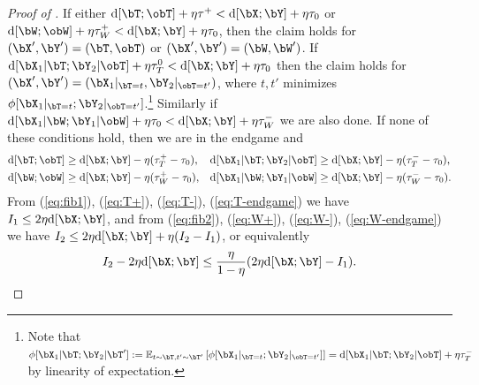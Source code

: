 \documentclass{article}
\DeclarePairedDelimiter{\sqpar}{[}{]}
\newcommand{\Ruz}{\mathrm{d}\sqpar}
\newcommand{\pot}{\phi\sqpar}
\begin{document}
\begin{proof}[Proof of ]
If either $\Ruz{\bT;\obT} + \eta\tau^+< \Ruz{\bX;\bY}+\eta \tau_0$ or $\Ruz{\bW;\obW}+\eta\tau^+_W< \Ruz{\bX;\bY}+\eta\tau_0$, then the claim holds for $(\bX',\bY')=(\bT,\obT)$ or $(\bX',\bY')=(\bW,\bW')$. If $\Ruz{\bX_1|\bT;\bY_2|\obT}+ \eta \tau^0_T< \Ruz{\bX;\bY}+\eta\tau_0$ then the claim holds for $(\bX',\bY')=(\bX_1|_{\bT=t},\bY_2|_{\obT=t'})$, where $t,t'$ minimizes $\pot{\bX_1|_{\bT=t};\bY_2|_{\obT=t'}}$.\footnote{Note that $\pot{\bX_1|\bT;\bY_2|\bT'}:=\ex[t\sim\bT,t'\sim\bT']{\pot{\bX_1|_{\bT=t};\bY_2|_{\obT=t'}}}=\Ruz{\bX_1|\bT;\bY_2|\obT}+\eta\tau^-_T$ by linearity of expectation.} Similarly if $\Ruz{\bX_1|\bW;\bY_1|\obW}+\eta\tau_0< \Ruz{\bX;\bY}+\eta\tau_W^-$ we are also done. If none of these conditions hold, then we are in the endgame and 
\begin{align}
\Ruz{\bT;\obT}&\ge\Ruz{\bX;\bY}-\eta(\tau^+_T-\tau_0),& \Ruz{\bX_1|\bT;\bY_2|\obT}&\ge \Ruz{\bX;\bY}-\eta(\tau^-_T-\tau_0),\label{eq:T-endgame}\\
\Ruz{\bW;\obW}&\ge\Ruz{\bX;\bY}-\eta(\tau^+_W-\tau_0),& \Ruz{\bX_1|\bW;\bY_1|\obW}&\ge \Ruz{\bX;\bY}-\eta(\tau^-_W-\tau_0).\label{eq:W-endgame}
\end{align}
From (\ref{eq:fib1}), (\ref{eq:T+}), (\ref{eq:T-}), (\ref{eq:T-endgame}) we have 
$I_1\le 2\eta \Ruz{\bX;\bY}$,
and from (\ref{eq:fib2}), (\ref{eq:W+}), (\ref{eq:W-}), (\ref{eq:W-endgame}) we have $I_2\le 2\eta \Ruz{\bX;\bY}+\eta(I_2-I_1)$, or equivalently 
\begin{align}\label{eq:I2}
I_2-2\eta\Ruz{\bX;\bY}\le \frac{\eta}{1-\eta} (2\eta\Ruz{\bX;\bY}-I_1).
\end{align}


\end{proof}
\end{document}
